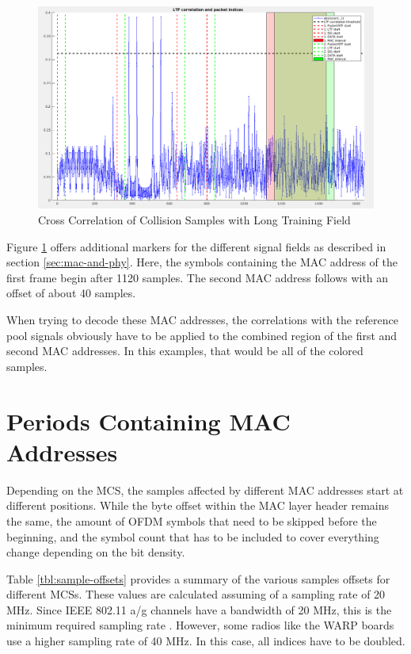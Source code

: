 \begin{figure}[H]
	\centering
	\includegraphics[width=\textwidth]{gfx/images/preamble-correlation}
	\caption{Cross Correlation of Collision Samples with Long Training Field}
	\label{fig:preamble-corr}
\end{figure}

Figure \ref{fig:preamble-corr} offers additional markers for the different signal fields as described in section \ref{sec:mac-and-phy}. Here, the symbols containing the MAC address of the first frame begin after 1120 samples. The second MAC address follows with an offset of about 40 samples.

When trying to decode these MAC addresses, the correlations with the reference pool signals obviously have to be applied to the combined region of the first and second MAC addresses. In this examples, that would be all of the colored samples.



\section{Periods Containing MAC Addresses}\label{sec:mac-periods}

Depending on the \gls{MCS}, the samples affected by different MAC addresses start at different positions. While the byte offset within the MAC layer header remains the same, the amount of OFDM symbols that need to be skipped before the beginning, and the symbol count that has to be included to cover everything change depending on the bit density.

Table \ref{tbl:sample-offsets} provides a summary of the various samples offsets for different \glspl{MCS}. These values are calculated assuming of a sampling rate of 20 MHz. Since IEEE 802.11 a/g channels have a bandwidth of 20 MHz, this is the minimum required sampling rate \cite{ieee2012}. However, some radios like the WARP boards use a higher sampling rate of 40 MHz. In this case, all indices have to be doubled.\\

